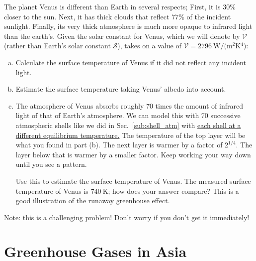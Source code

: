     \begin{exercise}
        The planet Venus is different than Earth in several respects; First, it is 30\% closer to the sun. Next, it has thick clouds that reflect 77\% of the incident sunlight. Finally, its very thick atmosphere is much more opaque to infrared light than the earth's. Given the solar constant for Venus, which we will denote by $\mathcal{V}$ (rather than Earth's solar constant $\mathcal{S}$), takes on a value of $\mathcal{V} = \SI{2796}{\watt/(\meter^2 \kelvin^4)}$:
        \begin{enumerate}[(a)]
            \item Calculate the surface temperature of Venus if it did not reflect any incident light.
            \item Estimate the surface temperature taking Venus' albedo into account.
            \item The atmosphere of Venus absorbs roughly 70 times the amount of infrared light of that of Earth's atmosphere. We can model this with 70 successive atmospheric shells like we did in Sec.~\ref{sub:shell_atm} with \underline{each shell at a different equilibrium temperature.} The temperature of the top layer will be what you found in part (b). The next layer is warmer by a factor of $2^{1/4}$. The layer below that is warmer by a smaller factor. Keep working your way down until you see a pattern.

            Use this to estimate the surface temperature of Venus. The measured surface temperature of Venus is $\SI{740}{\kelvin}$; how does your answer compare? This is a good illustration of the runaway greenhouse effect.
        \end{enumerate}
        Note: this is a challenging problem! Don't worry if you don't get it immediately! 
        \label{ex:venus}
    \end{exercise}
    



\section{Greenhouse Gases in Asia} %
\label{sec:gg_in_asia}


